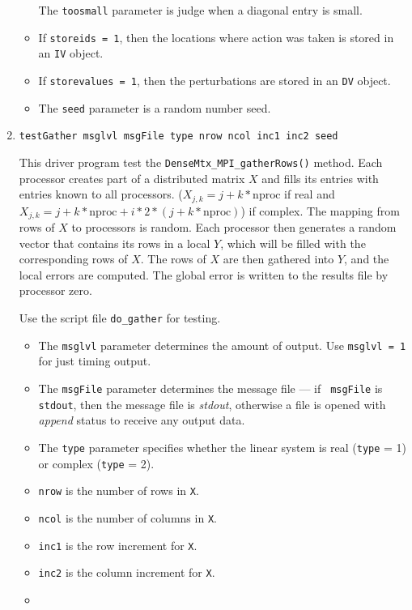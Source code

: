 \begin{enumerate}
\begin{itemize}
The {\tt toosmall} parameter is judge when a diagonal entry is small.
\item
If {\tt storeids = 1}, then the locations where action was taken is
stored in an {\tt IV} object.
\item
If {\tt storevalues = 1}, then the perturbations are
stored in an {\tt DV} object.
\item
The {\tt seed} parameter is a random number seed.
\end{itemize}
\item
\begin{verbatim}
testGather msglvl msgFile type nrow ncol inc1 inc2 seed
\end{verbatim}
This driver program test the {\tt DenseMtx\_MPI\_gatherRows()} method.
Each processor creates part of a distributed matrix $X$ and fills
its entries with entries known to all processors.
($X_{j,k} = j + k*\mbox{nproc}$ if real and
$X_{j,k} = j + k*\mbox{nproc} +
i*2*(j + k*\mbox{nproc})$) if complex.
The mapping from rows of $X$ to processors is random.
Each processor then generates a random vector that contains its rows
in a local $Y$, which will be filled with the corresponding rows of
$X$.
The rows of $X$ are then gathered into $Y$, and the local errors
are computed.
The global error is written to the results file by processor zero.
\par
Use the script file {\tt do\_gather} for testing.
\par
\begin{itemize}
\item
The {\tt msglvl} parameter determines the amount of output.
Use {\tt msglvl = 1} for just timing output.
\item
The {\tt msgFile} parameter determines the message file --- if {\tt
msgFile} is {\tt stdout}, then the message file is {\it stdout},
otherwise a file is opened with {\it append} status to receive any
output data.
\item
The {\tt type} parameter specifies whether the linear system is
real ({\tt type} = 1) or complex ({\tt type} = 2).
\item
{\tt nrow} is the number of rows in {\tt X}.
\item
{\tt ncol} is the number of columns in {\tt X}.
\item
{\tt inc1} is the row increment for {\tt X}.
\item
{\tt inc2} is the column increment for {\tt X}.
\item

\end{itemize}
\end{enumerate}
